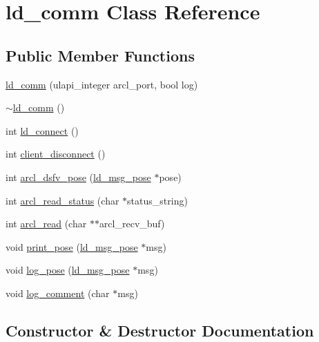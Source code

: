 \hypertarget{classld__comm}{}\section{ld\+\_\+comm Class Reference}
\label{classld__comm}
\subsection*{Public Member Functions}
\begin{DoxyCompactItemize}
\item 
\hyperlink{classld__comm_afecf4465db68994a6c4c6024338498c8}{ld\+\_\+comm} (ulapi\+\_\+integer arcl\+\_\+port, bool log)
\item 
\hyperlink{classld__comm_af403b74c6732802512b416fdcecef916}{$\sim$ld\+\_\+comm} ()
\item 
int \hyperlink{classld__comm_a8cd32085a2ad22929e381ffce3fed103}{ld\+\_\+connect} ()
\item 
int \hyperlink{classld__comm_ad9a9140d9e21ae6c991dda317808acce}{client\+\_\+disconnect} ()
\item 
int \hyperlink{classld__comm_a735b4f8a86715cd2fde806ae6f7ba6b3}{arcl\+\_\+dsfv\+\_\+pose} (\hyperlink{structld__msg__pose}{ld\+\_\+msg\+\_\+pose} $\ast$pose)
\item 
int \hyperlink{classld__comm_a936a049861974c0ffa5d836a1364aa03}{arcl\+\_\+read\+\_\+status} (char $\ast$status\+\_\+string)
\item 
int \hyperlink{classld__comm_afaca1d34911ee06e0b8d07efd3a074d3}{arcl\+\_\+read} (char $\ast$$\ast$arcl\+\_\+recv\+\_\+buf)
\item 
void \hyperlink{classld__comm_aceb15ae4635e8033ec46cb1a54a99c1f}{print\+\_\+pose} (\hyperlink{structld__msg__pose}{ld\+\_\+msg\+\_\+pose} $\ast$msg)
\item 
void \hyperlink{classld__comm_a1219ef460b9a510a448704f57ce0412e}{log\+\_\+pose} (\hyperlink{structld__msg__pose}{ld\+\_\+msg\+\_\+pose} $\ast$msg)
\item 
void \hyperlink{classld__comm_ad47e957c7397e42e82128ee143d8b143}{log\+\_\+comment} (char $\ast$msg)
\end{DoxyCompactItemize}


\subsection{Constructor \& Destructor Documentation}
\mbox{\label{classld__comm_afecf4465db68994a6c4c6024338498c8}} 
